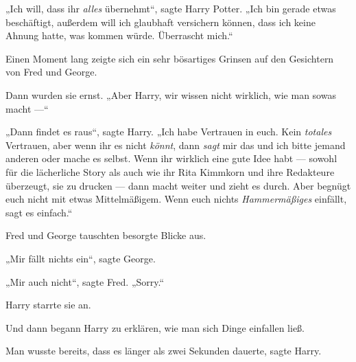 „Ich will, dass ihr \emph{alles} übernehmt“, sagte Harry Potter.
„Ich bin gerade etwas beschäftigt, außerdem will ich glaubhaft versichern können, dass ich keine Ahnung hatte, was kommen würde. Überrascht mich.“

Einen Moment lang zeigte sich ein sehr bösartiges Grinsen auf den Gesichtern von Fred und George.

Dann wurden sie ernst.
„Aber Harry, wir wissen nicht wirklich, wie man sowas macht —“

„Dann findet es raus“, sagte Harry.
„Ich habe Vertrauen in euch. Kein \emph{totales} Vertrauen, aber wenn ihr es nicht \emph{könnt}, dann \emph{sagt} mir das und ich bitte jemand anderen oder mache es selbst. Wenn ihr wirklich eine gute Idee habt — sowohl für die lächerliche Story als auch wie ihr Rita Kimmkorn und ihre Redakteure überzeugt, sie zu drucken — dann macht weiter und zieht es durch. Aber begnügt euch nicht mit etwas Mittelmäßigem. Wenn euch nichts \emph{Hammermäßiges} einfällt, sagt es einfach.“

Fred und George tauschten besorgte Blicke aus.

„Mir fällt nichts ein“, sagte George.

„Mir auch nicht“, sagte Fred.
„Sorry.“

Harry starrte sie an.

Und dann begann Harry zu erklären, wie man sich Dinge einfallen ließ.

Man wusste bereits, dass es länger als zwei Sekunden dauerte, sagte Harry.

